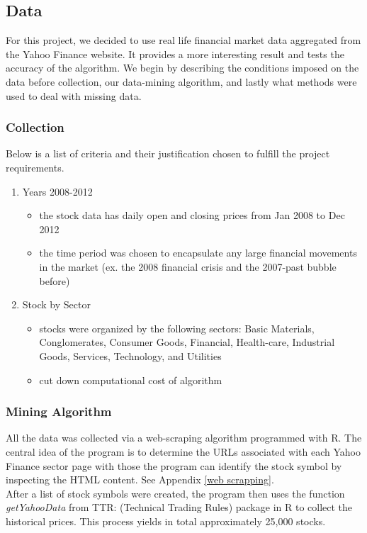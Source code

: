 \documentclass[12pt,titlepage,letter]{article}
\begin{document}
	\subsection{Data}
		For this project, we decided to use real life financial market data aggregated from the Yahoo Finance website. It provides a more interesting result and tests the accuracy of the algorithm. We begin by describing the conditions imposed on the data before collection, our data-mining algorithm, and lastly what methods were used to deal with missing data.
		\subsubsection{Collection}
			Below is a list of criteria and their justification chosen to fulfill the project requirements. 
			\begin{enumerate}
				\item Years 2008-2012
				\begin{itemize}
					\item the stock data has daily open and closing prices from Jan 2008 to Dec 2012
					\item the time period was chosen to encapsulate any large financial movements in the market (ex. the 2008 financial crisis and the 2007-past bubble before)
				\end{itemize}
					\item Stock by Sector
				\begin{itemize}
					\item stocks were organized by the following sectors: Basic Materials, Conglomerates, Consumer Goods, Financial, Health-care, Industrial Goods, Services, Technology, and Utilities
					\item cut down computational cost of algorithm
				\end{itemize}
			\end{enumerate}

		\subsubsection{Mining Algorithm}
			All the data was collected via a web-scraping algorithm programmed with R. The central idea of the program is to determine the URLs associated with each Yahoo Finance sector page with those the program can identify the stock symbol by inspecting the HTML content. See Appendix \ref{web scrapping}.\\

			After a list of stock symbols were created, the program then uses the function \textit{getYahooData} from TTR: (Technical Trading Rules) package in R to collect the historical prices. This process yields in total approximately 25,000 stocks. 
		
\end{document}
